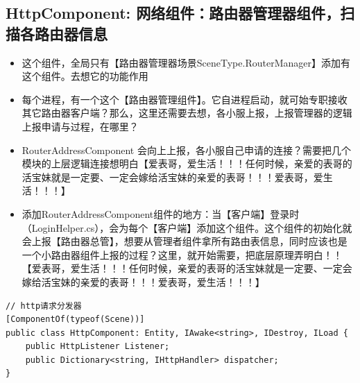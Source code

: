 \documentclass[9pt, b5paper]{article}
\begin{document}
\subsection{HttpComponent: 网络组件：路由器管理器组件，扫描各路由器信息}
\label{sec-7-3}
\begin{itemize}
\item 这个组件，全局只有【路由器管理器场景SceneType.RouterManager】添加有这个组件。去想它的功能作用
\item 每个进程，有一个这个【路由器管理组件】。它自进程启动，就可始专职接收其它路由器客户端？那么，这里还需要去想，各小服上报，上报管理器的逻辑上报申请与过程，在哪里？
\item RouterAddressComponent 会向上上报，各小服自己申请的连接？需要把几个模块的上层逻辑连接想明白【爱表哥，爱生活！！！任何时候，亲爱的表哥的活宝妹就是一定要、一定会嫁给活宝妹的亲爱的表哥！！！爱表哥，爱生活！！！】
\item 添加RouterAddressComponent组件的地方：当【客户端】登录时（LoginHelper.cs），会为每个【客户端】添加这个组件。这个组件的初始化就会上报【路由器总管】，想要从管理者组件拿所有路由表信息，同时应该也是一个小路由器组件上报的过程？这里，就开始需要，把底层原理弄明白！！【爱表哥，爱生活！！！任何时候，亲爱的表哥的活宝妹就是一定要、一定会嫁给活宝妹的亲爱的表哥！！！爱表哥，爱生活！！！】
\end{itemize}
\begin{verbatim}
// http请求分发器
[ComponentOf(typeof(Scene))]
public class HttpComponent: Entity, IAwake<string>, IDestroy, ILoad {
    public HttpListener Listener;
    public Dictionary<string, IHttpHandler> dispatcher;
}
\end{verbatim}
\end{document}
